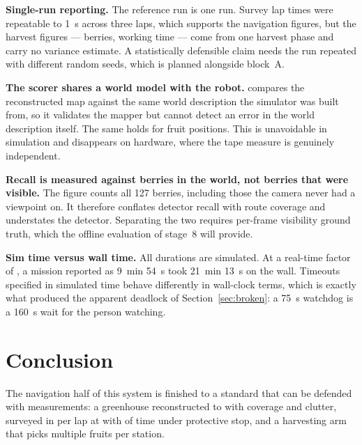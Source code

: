 \documentclass[conference]{IEEEtran}
\begin{document}
\textbf{Single-run reporting.} The reference run is one run. Survey lap times
were repeatable to \SI{1}{s} across three laps, which supports the navigation
figures, but the harvest figures ---  berries, 
working time --- come from one harvest phase and carry no variance estimate.
A statistically defensible claim needs the run repeated with different random
seeds, which is planned alongside block~A.

\textbf{The scorer shares a world model with the robot.}
 compares the reconstructed map against the same world
description the simulator was built from, so it validates the mapper but
cannot detect an error in the world description itself. The same holds for
fruit positions. This is unavoidable in simulation and disappears on hardware,
where the tape measure is genuinely independent.

\textbf{Recall is measured against berries in the world, not berries that were
visible.} The  figure counts all 127 berries, including those
the camera never had a viewpoint on. It therefore conflates detector recall
with route coverage and understates the detector. Separating the two requires
per-frame visibility ground truth, which the offline evaluation of stage~8
will provide.

\textbf{Sim time versus wall time.} All durations are simulated. At a
real-time factor of , a mission reported as \SI{9}{min}
\SI{54}{s} took \SI{21}{min} \SI{13}{s} on the wall. Timeouts specified in
simulated time behave differently in wall-clock terms, which is exactly what
produced the apparent deadlock of Section~\ref{sec:broken}: a \SI{75}{s}
watchdog is a \SI{160}{s} wait for the person watching.

\section{Conclusion}

The navigation half of this system is finished to a standard that can be
defended with measurements: a greenhouse reconstructed to
 with  coverage and
 clutter, surveyed in  per lap at
 with  of time under protective stop,
and a harvesting arm that picks multiple fruits per station.
\end{document}
